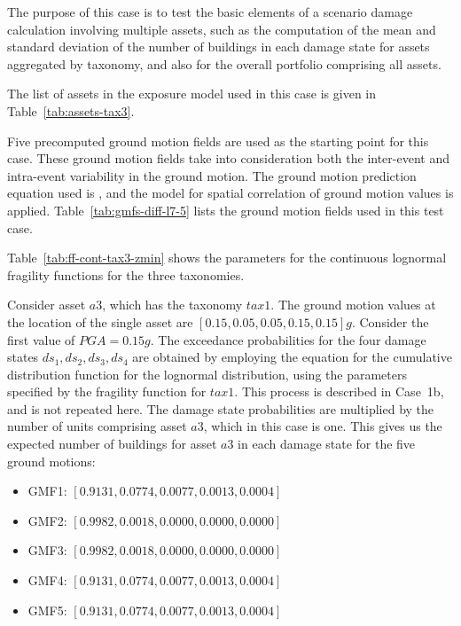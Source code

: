 The purpose of this case is to test the basic elements of a scenario damage calculation involving multiple assets, such as the computation of the mean and standard deviation of the number of buildings in each damage state for assets aggregated by taxonomy, and also for the overall portfolio comprising all assets.

The list of assets in the exposure model used in this case is given in Table~\ref{tab:assets-tax3}.

Five precomputed ground motion fields are used as the starting point for this case. These ground motion fields take into consideration both the inter-event and intra-event variability in the ground motion. The ground motion prediction equation used is \citet{boore2008}, and the \citet{jayaram2009} model for spatial correlation of ground motion values is applied. Table~\ref{tab:gmfs-diff-l7-5} lists the ground motion fields used in this test case.



Table~\ref{tab:ff-cont-tax3-zmin} shows the parameters for the continuous lognormal fragility functions for the three taxonomies.

Consider asset $a3$, which has the taxonomy $tax1$.  The ground motion values at the location of the single asset are $[0.15, 0.05, 0.05, 0.15, 0.15] g$. Consider the first value of $PGA = 0.15 g$. The exceedance probabilities for the four damage states $ds_1, ds_2, ds_3, ds_4$ are obtained by employing the equation for the cumulative distribution function for the lognormal distribution, using the parameters specified by the fragility function for $tax1$. This process is described in Case~1b, and is not repeated here. The damage state probabilities are multiplied by the number of units comprising asset $a3$, which in this case is one. This gives us the expected number of buildings for asset $a3$ in each damage state for the five ground motions:

\begin{itemize}
	\item GMF1: $[0.9131, 0.0774, 0.0077, 0.0013, 0.0004]$
	\item GMF2: $[0.9982, 0.0018, 0.0000, 0.0000, 0.0000]$
	\item GMF3: $[0.9982, 0.0018, 0.0000, 0.0000, 0.0000]$
	\item GMF4: $[0.9131, 0.0774, 0.0077, 0.0013, 0.0004]$
	\item GMF5: $[0.9131, 0.0774, 0.0077, 0.0013, 0.0004]$
\end{itemize}

